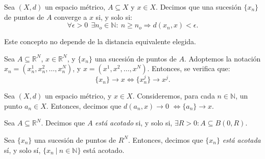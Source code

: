 \begin{ndef}
Sea $(X,d)$ un espacio métrico, $A\subseteq X$ y $x\in X$. Decimos que una sucesión $\{x_n\}$ de puntos de $A$ converge a $x$ si, y solo si: $$ \forall \epsilon > 0\ \ \exists n_o \in \mathbb{N}: \ n\ge n_o \Rightarrow d(x_n,x) < \epsilon.$$
\end{ndef}



\begin{nota}
Este concepto no depende de la distancia equivalente elegida.
\end{nota}



\begin{nprop}
Sea $A\subseteq \mathbb{R}^N$, $x\in \mathbb{R}^N$, y $\{x_n\}$ una sucesión de puntos de $A$. Adoptemos la notación $x_n = (x_n^1, x_n^2,\dots,x_n^N)$, y $x=(x^1, x^2,\dots, x^N)$. Entonces, se verifica que:
$$\{x_n\} \rightarrow x \iff \{x_n^j\} \rightarrow x^j.$$
\end{nprop}








\begin{ndef}
Sea $(X,d)$ un espacio métrico, y $x\in X$. Consideremos, para cada $n\in \mathbb{N}$, un punto $a_n \in X$. Entonces, decimos que $d(a_n,x) \rightarrow 0$ $\iff \{a_n\} \rightarrow x$.
\end{ndef}



\begin{ndef}
Sea $A \subseteq \mathbb{R}^N$. Decimos que $A$ \textit{está acotado} si, y solo si, $\exists R>0: A\subseteq B(0,R)$.
\end{ndef}



\begin{ndef}
Sea $\{x_n\}$ una sucesión de puntos de $R^N$. Entonces, decimos que $\{x_n\}$ \textit{está acotada} sí, y solo sí, $\{x_n\ | \ n\in \mathbb{N}\}$ está acotado.
\end{ndef}



